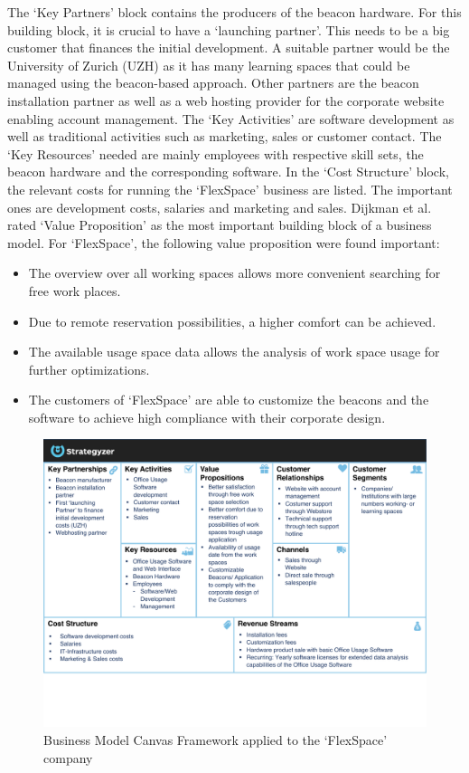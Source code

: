 		The `Key Partners' block contains the producers of the beacon hardware. For this building block, it is crucial to have a `launching partner'. This needs to be a big customer that finances the initial development. A suitable partner would be the University of Zurich (UZH) as it has many learning spaces that could be managed using the beacon-based approach. Other partners are the beacon installation partner as well as a web hosting provider for the corporate website enabling account management. The `Key Activities' are software development as well as traditional activities such as marketing, sales or customer contact. The `Key Resources' needed are mainly employees with respective skill sets, the beacon hardware and the corresponding software. In the `Cost Structure' block, the relevant costs for running the `FlexSpace' business are listed. The important ones are development costs, salaries and marketing and sales. Dijkman et al. \cite{dijkman} rated `Value Proposition' as the most important building block of a business model. For `FlexSpace', the following value proposition were found important:
		\vspace{-1em}
		\begin{itemize}
			\item The overview over all working spaces allows more convenient searching for free work places.
			\item Due to remote reservation possibilities, a higher comfort can be achieved. 
			\item The available usage space data allows the analysis of work space usage for further optimizations.
			\item The customers of `FlexSpace' are able to customize the beacons and the software to achieve high compliance with their corporate design.  
		\end{itemize}
		\vspace{-1em}

			\begin{figure}[H]
			    \begin{center}
			    \includegraphics[scale=0.6]{Talk11/use_case_dijkman.pdf}
			    \end{center}
			    \caption{Business Model Canvas Framework applied to the `FlexSpace' company}
			    \label{fig:bmc_flex}
			\end{figure}

